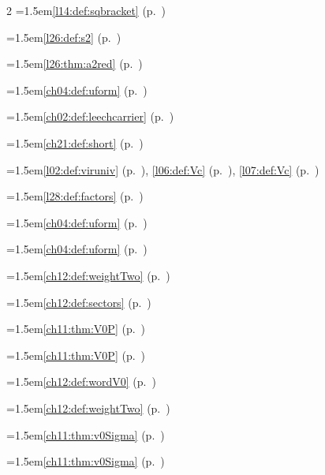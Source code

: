 \begin{multicols}{2}
\hangindent=1.5em\quad \ref{l14:def:sqbracket} (p.~\pageref{l14:def:sqbracket})\par
\hangindent=1.5em\quad \ref{l26:def:s2} (p.~\pageref{l26:def:s2})\par
\hangindent=1.5em\quad \ref{l26:thm:a2red} (p.~\pageref{l26:thm:a2red})\par
\hangindent=1.5em\quad \ref{ch04:def:uform} (p.~\pageref{ch04:def:uform})\par
\hangindent=1.5em\quad \ref{ch02:def:leechcarrier} (p.~\pageref{ch02:def:leechcarrier})\par
\hangindent=1.5em\quad \ref{ch21:def:short} (p.~\pageref{ch21:def:short})\par
\hangindent=1.5em\quad \ref{l02:def:viruniv} (p.~\pageref{l02:def:viruniv}), \ref{l06:def:Vc} (p.~\pageref{l06:def:Vc}), \ref{l07:def:Vc} (p.~\pageref{l07:def:Vc})\par
\hangindent=1.5em\quad \ref{l28:def:factors} (p.~\pageref{l28:def:factors})\par
\hangindent=1.5em\quad \ref{ch04:def:uform} (p.~\pageref{ch04:def:uform})\par
\hangindent=1.5em\quad \ref{ch04:def:uform} (p.~\pageref{ch04:def:uform})\par
\par{}\par\nopagebreak\smallskip
\hangindent=1.5em\quad \ref{ch12:def:weightTwo} (p.~\pageref{ch12:def:weightTwo})\par
\hangindent=1.5em\quad \ref{ch12:def:sectors} (p.~\pageref{ch12:def:sectors})\par
\hangindent=1.5em\quad \ref{ch11:thm:V0P} (p.~\pageref{ch11:thm:V0P})\par
\hangindent=1.5em\quad \ref{ch11:thm:V0P} (p.~\pageref{ch11:thm:V0P})\par
\hangindent=1.5em\quad \ref{ch12:def:wordV0} (p.~\pageref{ch12:def:wordV0})\par
\hangindent=1.5em\quad \ref{ch12:def:weightTwo} (p.~\pageref{ch12:def:weightTwo})\par
\hangindent=1.5em\quad \ref{ch11:thm:v0Sigma} (p.~\pageref{ch11:thm:v0Sigma})\par
\hangindent=1.5em\quad \ref{ch11:thm:v0Sigma} (p.~\pageref{ch11:thm:v0Sigma})\par

\end{multicols}

